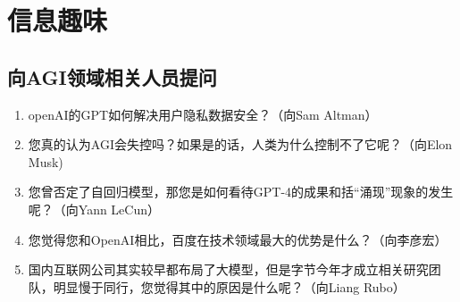 \section{信息趣味}
\subsection{向AGI领域相关人员提问}
\begin{enumerate}
    \item openAI的GPT如何解决用户隐私数据安全？（向Sam Altman）
    \item 您真的认为AGI会失控吗？如果是的话，人类为什么控制不了它呢？（向Elon Musk)
    \item 您曾否定了自回归模型，那您是如何看待GPT-4的成果和括“涌现”现象的发生呢？（向Yann LeCun）
    \item 您觉得您和OpenAI相比，百度在技术领域最大的优势是什么？（向李彦宏）
    \item 国内互联网公司其实较早都布局了大模型，但是字节今年才成立相关研究团队，明显慢于同行，您觉得其中的原因是什么呢？（向Liang Rubo）
\end{enumerate}

